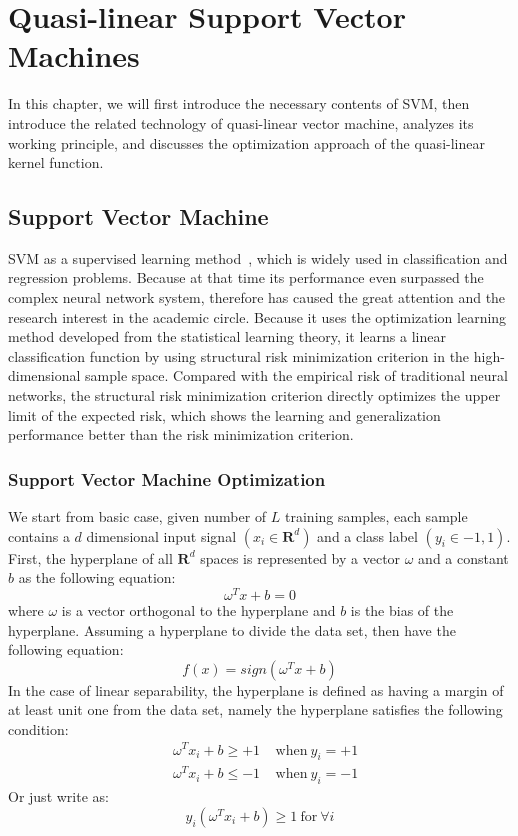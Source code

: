 \documentclass[master]{IPSstyle}
\begin{document}
\chapter{Quasi-linear Support Vector Machines} \label{ch2}

In this chapter, we will first introduce the necessary contents of SVM, then introduce the related technology of quasi-linear vector machine, analyzes its working principle, and discusses the optimization approach of the quasi-linear kernel function.

\section{Support Vector Machine}
SVM as a supervised learning method~\cite{vapnik2000nature}, which is widely used in classification and regression problems. Because at that time its performance even surpassed the complex neural network system, therefore has caused the great attention and the research interest in the academic circle. Because it uses the optimization learning method developed from the statistical learning theory, it learns a linear classification function by using structural risk minimization criterion in the high-dimensional sample space. Compared with the empirical risk of traditional neural networks, the structural risk minimization criterion directly optimizes the upper limit of the expected risk, which shows the learning and generalization performance better than the risk minimization criterion.

\subsection{Support Vector Machine Optimization}
We start from basic case, given number of $L$ training samples, each sample contains a $d$ dimensional input signal  $(x_i \in \mathbf{R}^d)$ and a class label $(y_i \in {-1, 1})$. First, the hyperplane of all $\mathbf{R}^d$ spaces is represented by a vector $\omega$ and a constant $b$ as the following equation:
\begin{equation}
\omega^Tx+b=0
\end{equation}
where $\omega$ is a vector orthogonal to the hyperplane and $b$ is the bias of the hyperplane. Assuming a hyperplane to divide the data set, then have the following equation:
\begin{equation}
f(x) = sign(\omega^T x + b)
\end{equation}
In the case of linear separability, the hyperplane is defined as having a margin of at least unit one from the data set, namely the hyperplane satisfies the following condition:
\begin{align}
&\omega^T x_i + b \geq + 1 ~~~~~ \text{when} ~ y_i =+1 \\
&\omega^T x_i + b \leq -1 ~~~~~ \text{when} ~ y_i =- 1
\end{align}
Or just write as:
\begin{equation}
y_i \left( \omega^T x_i + b \right) \geq 1 ~\text{for} ~\forall i \label{eq2.5}
\end{equation}
\end{document}
